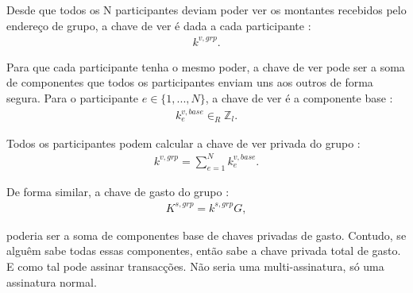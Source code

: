 Desde que todos os N participantes deviam poder ver os montantes recebidos pelo endereço de grupo, a chave de ver é dada a cada participante :
\begin{align*}
k^{v,grp} .
\end{align*}

Para que cada participante tenha o mesmo poder, a chave de ver pode ser a soma de componentes que todos os participantes enviam uns aos outros de forma segura. Para o participante $e \in \{1,...,N\}$, a chave de ver é a componente base : 
\begin{align*}
k^{v,base}_e \in_R \mathbb{Z}_l . 
\end{align*}

Todos os participantes podem calcular a chave de ver privada do grupo :
\begin{align*}
k^{v,grp} = \sum^{N}_{e=1} k^{v,base}_e . 
\end{align*}



De forma similar, a chave de gasto do grupo :
\begin{align*}
K^{s,grp} = k^{s,grp} G ,
\end{align*}

poderia ser a soma de componentes base de chaves privadas de gasto. Contudo, se alguêm sabe todas essas componentes, então sabe a chave privada total de gasto. E como tal pode assinar transacções. Não seria uma multi-assinatura, só uma assinatura normal. 



